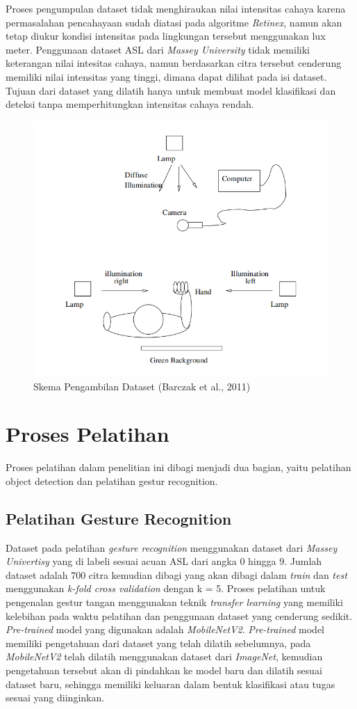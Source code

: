Proses pengumpulan dataset tidak menghiraukan nilai intensitas cahaya karena permasalahan pencahayaan sudah diatasi pada algoritme \emph{Retinex}, namun akan tetap diukur kondisi intensitas pada lingkungan tersebut menggunakan lux meter. Penggunaan dataset ASL dari \emph{Massey University} tidak memiliki keterangan nilai intesitas cahaya, namun berdasarkan citra tersebut cenderung memiliki nilai intensitas yang tinggi, dimana dapat dilihat pada isi dataset. Tujuan dari dataset yang dilatih hanya untuk membuat model klasifikasi dan deteksi tanpa memperhitungkan intensitas cahaya rendah.
\begin{figure}[H]
	\centering
	\includegraphics[width=0.8\linewidth]{setup}
	\caption{Skema Pengambilan Dataset (Barczak et al., 2011)}
	\label{fig:setup}
\end{figure}
\section{Proses Pelatihan}
Proses pelatihan dalam penelitian ini dibagi menjadi dua bagian, yaitu pelatihan object detection dan pelatihan gestur recognition.
\subsection{Pelatihan Gesture Recognition}
Dataset pada pelatihan \emph{gesture recognition} menggunakan dataset dari \emph{Massey Univertisy} yang di labeli sesuai acuan ASL dari angka 0 hingga 9. Jumlah dataset adalah 700 citra kemudian dibagi yang akan dibagi dalam \emph{train} dan \emph{test} menggunakan \emph{k-fold cross validation} dengan k = 5.
Proses pelatihan untuk pengenalan gestur tangan menggunakan teknik \emph{transfer learning} yang memiliki kelebihan pada waktu pelatihan dan penggunaan dataset yang cenderung sedikit. \emph{Pre-trained} model yang digunakan adalah \emph{MobileNetV2}. \emph{Pre-trained} model memiliki pengetahuan dari dataset yang telah dilatih sebelumnya, pada \emph{MobileNetV2} telah dilatih menggunakan dataset dari \emph{ImageNet}, kemudian pengetahuan tersebut akan di pindahkan ke model baru dan dilatih sesuai dataset baru, sehingga memiliki keluaran dalam bentuk klasifikasi atau tugas sesuai yang diinginkan.

